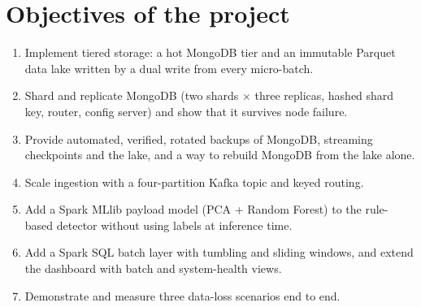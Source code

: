 \section{Objectives of the project}
\justify
\begin{enumerate}[noitemsep]
\item Implement tiered storage: a hot MongoDB tier and an immutable Parquet data lake written by a dual write from every micro-batch.
\item Shard and replicate MongoDB (two shards $\times$ three replicas, hashed shard key, router, config server) and show that it survives node failure.
\item Provide automated, verified, rotated backups of MongoDB, streaming checkpoints and the lake, and a way to rebuild MongoDB from the lake alone.
\item Scale ingestion with a four-partition Kafka topic and keyed routing.
\item Add a Spark MLlib payload model (PCA + Random Forest) to the rule-based detector without using labels at inference time.
\item Add a Spark SQL batch layer with tumbling and sliding windows, and extend the dashboard with batch and system-health views.
\item Demonstrate and measure three data-loss scenarios end to end.
\end{enumerate}
